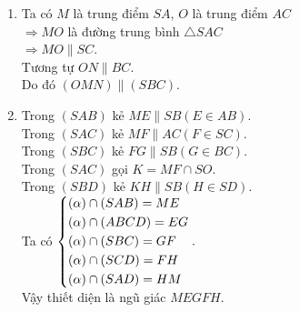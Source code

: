 \begin{bt}
{\begin{enumerate}
	\item Ta có $M$ là trung điểm $SA$, $O$ là trung điểm $AC$\\
	$\Rightarrow MO$ là đường trung bình $\triangle SAC$\\
	$\Rightarrow MO \parallel SC$.\\
	Tương tự $ON \parallel BC$.\\
	Do đó $(OMN) \parallel (SBC)$.
	\item Trong $(SAB )$  kẻ $ME \parallel SB (E \in AB)$.\\
	Trong $(SAC )$ kẻ $MF \parallel AC (F \in SC)$.\\
	Trong $(SBC )$ kẻ $FG \parallel SB (G \in BC)$.\\
	Trong $(SAC )$ gọi $K = MF \cap SO$.\\
	Trong $(SBD )$ kẻ $KH \parallel SB (H \in SD)$.\\
	Ta có $\left\{\begin{aligned}&(\alpha) \cap (SAB) = ME\\&(\alpha) \cap (ABCD) = EG\\&(\alpha) \cap (SBC) = GF\\&(\alpha) \cap (SCD) = FH\\&(\alpha) \cap (SAD) = HM\end{aligned}\right..$\\
	Vậy thiết diện là ngũ giác $MEGFH$.
	\end{enumerate}
}
\end{bt}

